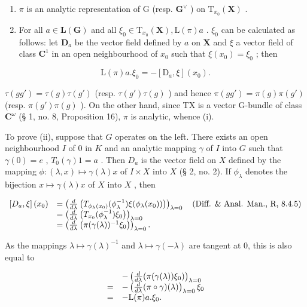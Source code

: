 \begin{enumerate}
\def\labelenumi{(\roman{enumi})}
\item
  \(\pi\) is an analytic representation of G (resp. \(\mathbf{G}^{\vee}\) ) on \(\mathrm{T}_{x_0}(\mathbf{X})\) .
\item
  For all \(a \in \mathbf{L}(\mathbf{G})\) and all \(\xi_0 \in \mathrm{T}_{x_0}(\mathbf{X}), \mathrm{L}(\pi)a\) . \(\xi_0\) can be calculated as follows: let \(\mathbf{D}_a\) be the vector field defined by \(a\) on \(\mathbf{X}\) and \(\xi\) a vector field of class \(\mathbf{C}^1\) in an open neighbourhood of \(x_0\) such that \(\xi(x_0) = \xi_0\) ; then
\end{enumerate}

\[
\mathrm{L} (\pi) a. \xi_ {0} = - [ \mathrm{D} _ {a}, \xi ] (x _ {0}).
\]

\(\tau(gg') = \tau(g)\tau(g')\) (resp. \(\tau(g')\tau(g)\) ) and hence \(\pi(gg') = \pi(g)\pi(g')\) (resp. \(\pi(g')\pi(g)\) ). On the other hand, since TX is a vector G-bundle of class \(\mathbf{C}^{\omega}\) (§ 1, no. 8, Proposition 16), \(\pi\) is analytic, whence (i).

To prove (ii), suppose that \(G\) operates on the left. There exists an open neighbourhood \(I\) of \(0\) in \(K\) and an analytic mapping \(\gamma\) of \(I\) into \(G\) such that \(\gamma(0) = e\) , \(T_0(\gamma)1 = a\) . Then \(D_a\) is the vector field on \(X\) defined by the mapping \(\phi: (\lambda, x) \mapsto \gamma(\lambda)x\) of \(I \times X\) into \(X\) (§ 2, no. 2). If \(\phi_{\lambda}\) denotes the bijection \(x \mapsto \gamma(\lambda)x\) of \(X\) into \(X\) , then

\[
\begin{array}{r l} \left[ D _ {a}, \xi \right] (x _ {0}) & = \left(\frac {d}{d \lambda} \left(T _ {\phi_ {\lambda} (x _ {0})} (\phi_ {\lambda} ^ {- 1}) \xi (\phi_ {\lambda} (x _ {0}))\right)\right) _ {\lambda = 0} \quad \text {(Diff. \& Anal. Man., R, 8.4.5)} \\ & = \left(\frac {d}{d \lambda} \left(T _ {x _ {0}} (\phi_ {\lambda} ^ {- 1}) \xi_ {0}\right)\right) _ {\lambda = 0} \\ & = \left(\frac {d}{d \lambda} \left(\pi (\gamma (\lambda)) ^ {- 1} \xi_ {0}\right)\right) _ {\lambda = 0}. \end{array}
\]

As the mappings \(\lambda \mapsto \gamma (\lambda)^{-1}\) and \(\lambda \mapsto \gamma (-\lambda)\) are tangent at 0, this is also equal to

\[
\begin{array}{r l} & {- \left(\frac {d}{d \lambda} (\pi (\gamma (\lambda)) \xi_ {0})\right) _ {\lambda = 0}} \\ {=} & {- \left(\frac {d}{d \lambda} (\pi \circ \gamma) (\lambda)\right) _ {\lambda = 0} \xi_ {0}} \\ {=} & {- \mathrm{L} (\pi) a. \xi_ {0}.} \end{array}
\]
